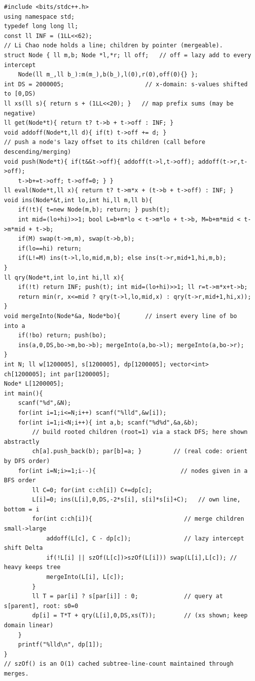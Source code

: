 \begin{lstlisting}[caption={COT6: bottom-up Li Chao tree per node merged small-to-large; each line has slope minus-two prefix-sum and intercept squared-prefix-sum plus a path term, carrying a lazy intercept offset Delta on merge; the query reads the best bottom at the parent's prefix sum}, label={lst:c29-cot6}]
#include <bits/stdc++.h>
using namespace std;
typedef long long ll;
const ll INF = (1LL<<62);
// Li Chao node holds a line; children by pointer (mergeable).
struct Node { ll m,b; Node *l,*r; ll off;   // off = lazy add to every intercept
    Node(ll m_,ll b_):m(m_),b(b_),l(0),r(0),off(0){} };
int DS = 2000005;                       // x-domain: s-values shifted to [0,DS)
ll xs(ll s){ return s + (1LL<<20); }   // map prefix sums (may be negative)
ll get(Node*t){ return t? t->b + t->off : INF; }
void addoff(Node*t,ll d){ if(t) t->off += d; }
// push a node's lazy offset to its children (call before descending/merging)
void push(Node*t){ if(t&&t->off){ addoff(t->l,t->off); addoff(t->r,t->off);
    t->b+=t->off; t->off=0; } }
ll eval(Node*t,ll x){ return t? t->m*x + (t->b + t->off) : INF; }
void ins(Node*&t,int lo,int hi,ll m,ll b){
    if(!t){ t=new Node(m,b); return; } push(t);
    int mid=(lo+hi)>>1; bool L=b+m*lo < t->m*lo + t->b, M=b+m*mid < t->m*mid + t->b;
    if(M) swap(t->m,m), swap(t->b,b);
    if(lo==hi) return;
    if(L!=M) ins(t->l,lo,mid,m,b); else ins(t->r,mid+1,hi,m,b);
}
ll qry(Node*t,int lo,int hi,ll x){
    if(!t) return INF; push(t); int mid=(lo+hi)>>1; ll r=t->m*x+t->b;
    return min(r, x<=mid ? qry(t->l,lo,mid,x) : qry(t->r,mid+1,hi,x));
}
void mergeInto(Node*&a, Node*bo){       // insert every line of bo into a
    if(!bo) return; push(bo);
    ins(a,0,DS,bo->m,bo->b); mergeInto(a,bo->l); mergeInto(a,bo->r);
}
int N; ll w[1200005], s[1200005], dp[1200005]; vector<int> ch[1200005]; int par[1200005];
Node* L[1200005];
int main(){
    scanf("%d",&N);
    for(int i=1;i<=N;i++) scanf("%lld",&w[i]);
    for(int i=1;i<N;i++){ int a,b; scanf("%d%d",&a,&b);
        // build rooted children (root=1) via a stack DFS; here shown abstractly
        ch[a].push_back(b); par[b]=a; }         // (real code: orient by DFS order)
    for(int i=N;i>=1;i--){                        // nodes given in a BFS order
        ll C=0; for(int c:ch[i]) C+=dp[c];
        L[i]=0; ins(L[i],0,DS,-2*s[i], s[i]*s[i]+C);   // own line, bottom = i
        for(int c:ch[i]){                          // merge children small->large
            addoff(L[c], C - dp[c]);               // lazy intercept shift Delta
            if(!L[i] || szOf(L[c])>szOf(L[i])) swap(L[i],L[c]); // heavy keeps tree
            mergeInto(L[i], L[c]);
        }
        ll T = par[i] ? s[par[i]] : 0;             // query at s[parent], root: s0=0
        dp[i] = T*T + qry(L[i],0,DS,xs(T));        // (xs shown; keep domain linear)
    }
    printf("%lld\n", dp[1]);
}
// szOf() is an O(1) cached subtree-line-count maintained through merges.
\end{lstlisting}

